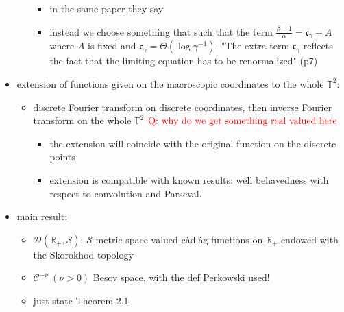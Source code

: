 \documentclass{report}
\theoremstyle{remark}
\theoremstyle{definition}
\begin{document}
\begin{itemize}
\begin{itemize}
    \begin{itemize}
      \item in the same paper they say 
      \item instead we choose something that such that the term $\frac{\beta -1}{\alpha} = \mathfrak{c}_\gamma +A$ where $A$ is fixed and $\mathfrak{c}_\gamma = \Theta(\log{\gamma^{-1}})$. "The extra term $\mathfrak{c}_\gamma$ reflects the fact that the limiting equation has to be renormalized" (p7)
    \end{itemize}
  \end{itemize}
  \item extension of functions given on the macroscopic coordinates to the whole $\mathbb{T}^2$:
  \begin{itemize}
    \item discrete Fourier transform on discrete coordinates, then inverse Fourier transform on the whole $\mathbb{T}^2$ $\textcolor{red}{\text{Q: why do we get something real valued here}}$   
    \begin{itemize}
      \item the extension will coincide with the original function on the discrete points
      \item extension is compatible with known results: well behavedness with respect to convolution and Parseval.
    \end{itemize}
  \end{itemize}
  \item main result:
  \begin{itemize}
    \item $\mathcal{D}(\mathbb{R}_+, \mathcal{S})$: $\mathcal{S}$ metric space-valued càdlàg functions on $\mathbb{R}_+$ endowed with the Skorokhod topology
    \item $\mathcal{C}^{-\nu}~(\nu > 0)$ Besov space, with the def Perkowski used!
    \item just state Theorem 2.1
  \end{itemize}
\end{itemize}
\end{document}
